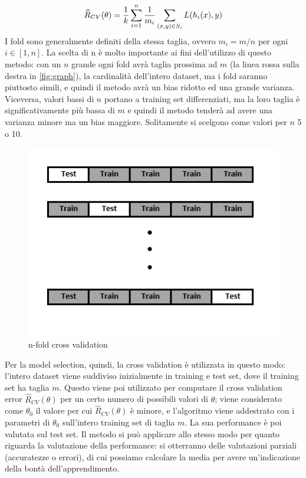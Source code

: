 \documentclass[oneside, openany]{book}
\begin{document}
		\[
		\widehat{R}_{CV}(\theta)={1\over k}\sum_{i=1}^n {1\over m_i}\sum_{(x,y)\in S_i} L(h_i(x),y)
		\]
		I fold sono generalmente definiti della stessa taglia, ovvero $m_i=m/n$ per ogni $i\in[1,n]$. La scelta di n è molto importante ai fini dell'utilizzo di questo metodo: con un $n$ grande ogni fold avrà taglia prossima ad $m$ (la linea rossa sulla destra in \ref{fig:graph}), la cardinalità dell'intero dataset, ma i fold saranno piuttosto simili, e quindi il metodo avrà un bias ridotto ed una grande varianza. Viceversa, valori bassi di $n$ portano a training set differenziati, ma la loro taglia è significativamente più bassa di $m$ e quindi il metodo tenderà ad avere una varianza minore ma un bias maggiore. Solitamente si scelgono come valori per $n$ 5 o 10. \\
	
		\begin{figure}[h]
			\begin{center}
				\begin{minipage}{0.47\textwidth}
					\centering
					\includegraphics[width=\textwidth]{CV1.png}
					\caption{n-fold cross validation}
					\label{fig:crossval}
				\end{minipage}
				
			\end{center}
		\end{figure}
	
	
		Per la model selection, quindi, la cross validation è utilizzata in questo modo: l'intero dataset viene suddiviso inizialmente in training e test set, dove il training set ha taglia $m$. Questo viene poi utilizzato per computare il cross validation error $\widehat{R}_{CV}(\theta)$ per un certo numero di possibili valori di $\theta$; viene considerato come $\theta_0$ il valore per cui $\widehat{R}_{CV}(\theta)$ è minore, e l'algoritmo viene addestrato con i parametri di $\theta_0$ sull'intero training set di taglia $m$. La sua performance è poi valutata sul test set.
		Il metodo si può applicare allo stesso modo per quanto riguarda la valutazione della performance: si otterranno delle valutazioni parziali (accuratezze o errori), di cui possiamo calcolare la media per avere un'indicazione della bontà dell'apprendimento.
		
\end{document}

